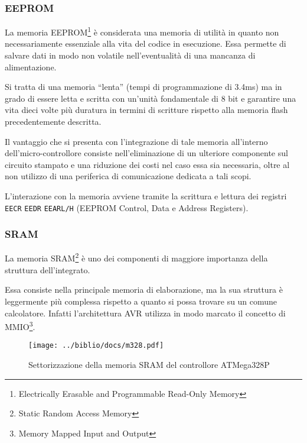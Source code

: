 \subsubsection{EEPROM}

La memoria EEPROM\footnote{Electrically Erasable and Programmable Read-Only Memory} è considerata una memoria di utilità in quanto non necessariamente essenziale alla vita del codice in esecuzione. Essa permette di salvare dati in modo non volatile nell'eventualità di una mancanza di alimentazione.

Si tratta di una memoria ``lenta'' (tempi di programmazione di 3.4ms\cite[tab 8-1]{avr:m328p}) ma in grado di essere letta e scritta con un'unità fondamentale di 8 bit\cite[sec 8.4]{avr:m328p} e garantire una vita dieci volte più duratura in termini di scritture rispetto alla memoria flash precedentemente descritta\cite[sec 8.2, sec 8.4]{avr:m328p}.

Il vantaggio che si presenta con l'integrazione di tale memoria all'interno dell'micro-controllore consiste nell'eliminazione di un ulteriore componente sul circuito stampato e una riduzione dei costi nel caso essa sia necessaria, oltre al non utilizzo di una periferica di comunicazione dedicata a tali scopi.

L'interazione con la memoria avviene tramite la scrittura e lettura dei registri \texttt{EECR} \texttt{EEDR} \texttt{EEARL/H} (EEPROM Control, Data e Address Registers)\cite[34]{avr:m328p}.

\subsubsection{SRAM}
La memoria SRAM\footnote{Static Random Access Memory} è uno dei componenti di maggiore importanza della struttura dell'integrato.

Essa consiste nella principale memoria di elaborazione, ma la sua struttura è leggermente più complessa rispetto a quanto si possa trovare su un comune calcolatore.
Infatti l'architettura AVR utilizza in modo marcato il concetto di MMIO\footnote{Memory Mapped Input and Output}.

\begin{figure}[b]
    \centering
    \texttt{[image: ../biblio/docs/m328.pdf]}
    \caption[Immagine ottenuta dal documento~\cite{avr:m328p}, fig. 8-3]{Settorizzazione della memoria SRAM del controllore ATMega328P\cite[fig 8-3]{avr:m328p}}\label{fig:avr-sram-alloc}
\end{figure}

